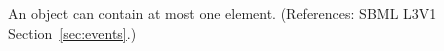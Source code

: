 An \Event object can contain at most one \Delay element. (References: SBML
L3V1 Section~\ref{sec:events}.)
